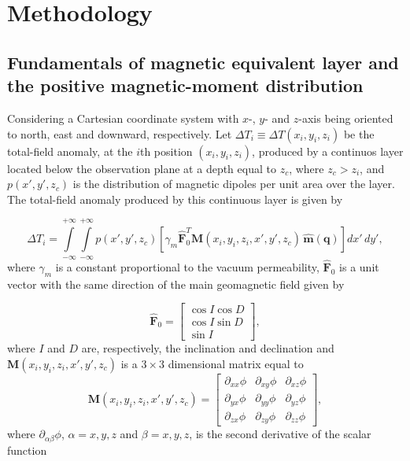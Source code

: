 \section{Methodology}
\label{sec:methodology}

\subsection{Fundamentals of magnetic equivalent layer and the positive magnetic-moment distribution}
\label{subsec:mag_eqlayer}

Considering a Cartesian coordinate system with $x$-, $y$- and $z$-axis being oriented to north, east and downward, respectively. Let $\Delta T_i \equiv \Delta T (x_i,y_i,z_i)$ be the total-field anomaly, at the $i$th position $(x_i,y_i,z_i)$, produced by a continuos layer located below the observation plane at a depth equal to $z_c$, where $z_c > z_i$, and $p(x',y',z_c)$ is the distribution of magnetic dipoles per unit area over the layer. The total-field anomaly produced by this continuous layer is given by 

\begin{equation}
\Delta T_i = \int \limits_{-\infty}^{+\infty } \int \limits_{-\infty}^{+\infty }  p(x',y',z_c)  [\gamma_m \hat{\mathbf{F}}_0^T \mathbf{M}(x_i,y_i,z_i,x',y',z_c) \,\hat{\mathbf{m}}(\mathbf{q})] dx' \,dy',
\label{eq:continuous_layer}
\end{equation}
where $\gamma_m$ is a constant proportional to the vacuum permeability, $\hat{\mathbf{F}}_0$ is a unit vector with the same direction of the main geomagnetic field given by

\begin{equation}
	\hat{\mathbf{F}}_0 =
	\left[ \begin{array}{c}
		 \cos I \cos D \\
		 \cos I \sin D \\
		 \sin I     
	\end{array} \right] ,
	\label{eq:main_field}
\end{equation}
where $I$ and $D$ are, respectively, the inclination and declination and $\mathbf{M}(x_i,y_i,z_i,x',y',z_c)$ is a $3 \times 3$ dimensional matrix \citep{oliveirajr_etal_2015} equal to  
\begin{equation}
\mathbf{M}(x_i,y_i,z_i,x',y',z_c) =
\left[ \begin{array}{ccc}
\partial_{xx} \phi & \partial_{xy} \phi &\partial_{xz} \phi \\  \partial_{yx} \phi & \partial_{yy} \phi &\partial_{yz} \phi \\  \partial_{zx} \phi &\partial_{zy}\phi  & \partial_{zz} \phi    
\end{array} \right] ,
\label{eq:H}
\end{equation}
where $\partial_{\alpha \beta} \phi$, $\alpha = x, y, z$ and $\beta = x, y, z$, is the second derivative of the scalar function 


